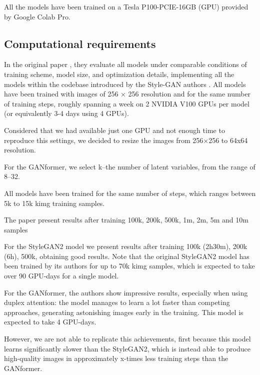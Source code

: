 \documentclass{article}
\begin{document}
	 All the models have been trained on a Tesla P100-PCIE-16GB (GPU) provided by Google 
	 Colab Pro.
	
	\subsection{Computational requirements}%
	In the original paper \cite{hudson2021generative}, they evaluate all models under comparable 
	conditions of training scheme, model size, and optimization details, implementing all the models 
	within the codebase introduced by the Style-GAN authors \cite{karras2020analyzing}. 
	All models have been trained with images of 256 × 256 resolution and for the 
	same number of training steps, roughly spanning a week on 2 NVIDIA V100 GPUs per model (or 
	equivalently 3-4 days using 4 GPUs). 
	
	Considered that we had available just one GPU and not enough time to reproduce this settings, we 
	decided to resize the images from 256×256 to 64x64 resolution.
	
	
	For the GANformer, we select k–the number of latent variables, from the range of 8–32. 
	
	All models have been trained for the same number of steps, which ranges between 5k to 15k kimg 
	training samples. 
	
	The paper present results after training 100k, 200k, 500k, 1m, 2m, 5m and 10m samples
	
	For the StyleGAN2 model we present results after training 100k (2h30m), 200k (6h), 500k, obtaining 
	good results.
	Note that the original StyleGAN2 model has been trained by its authors \cite{karras2020analyzing} 
	for up to 70k kimg samples, which is expected to take over 90 GPU-days for a single model. 
	

	For the GANformer, the authors \cite{karras2020analyzing} show impressive results, especially when 
	using duplex attention: the model manages to learn a lot faster than competing approaches, 
	generating astonishing images early in the training. This model is expected to take 4 GPU-days.
	
	However, we are not able to replicate this achievements, first because this model learns significantly 
	slower than the StyleGAN2, which is instead able to produce high-quality images in approximately 
	x-times less training steps than the GANformer.
	
\end{document}

